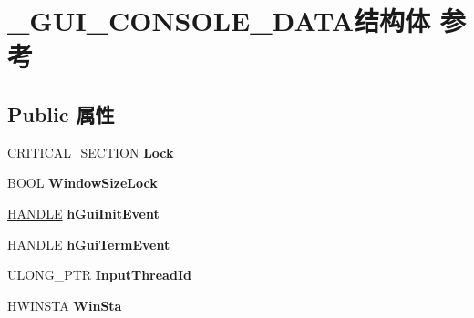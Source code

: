 \hypertarget{struct___g_u_i___c_o_n_s_o_l_e___d_a_t_a}{}\section{\+\_\+\+G\+U\+I\+\_\+\+C\+O\+N\+S\+O\+L\+E\+\_\+\+D\+A\+T\+A结构体 参考}
\label{struct___g_u_i___c_o_n_s_o_l_e___d_a_t_a}
\subsection*{Public 属性}
\begin{DoxyCompactItemize}
\item 
\mbox{\label{struct___g_u_i___c_o_n_s_o_l_e___d_a_t_a_a9a58505dcdd87ccac73b7a0d6cfcb242}} 
\hyperlink{struct___c_r_i_t_i_c_a_l___s_e_c_t_i_o_n}{C\+R\+I\+T\+I\+C\+A\+L\+\_\+\+S\+E\+C\+T\+I\+ON} {\bfseries Lock}
\item 
\mbox{\label{struct___g_u_i___c_o_n_s_o_l_e___d_a_t_a_a74f710b6ff7b2c7e42c0ee7fd5978f73}} 
B\+O\+OL {\bfseries Window\+Size\+Lock}
\item 
\mbox{\label{struct___g_u_i___c_o_n_s_o_l_e___d_a_t_a_a5d9a60a17c647747b83e9b9ce8cafab1}} 
\hyperlink{interfacevoid}{H\+A\+N\+D\+LE} {\bfseries h\+Gui\+Init\+Event}
\item 
\mbox{\label{struct___g_u_i___c_o_n_s_o_l_e___d_a_t_a_a709f942f35491ccb3acb75826c66cfe5}} 
\hyperlink{interfacevoid}{H\+A\+N\+D\+LE} {\bfseries h\+Gui\+Term\+Event}
\item 
\mbox{\label{struct___g_u_i___c_o_n_s_o_l_e___d_a_t_a_ab746542bf0e72fde8677542bbbb00fa7}} 
U\+L\+O\+N\+G\+\_\+\+P\+TR {\bfseries Input\+Thread\+Id}
\item 
\mbox{\label{struct___g_u_i___c_o_n_s_o_l_e___d_a_t_a_a35c49defb7107cc6dfaa70411d599a9c}} 
H\+W\+I\+N\+S\+TA {\bfseries Win\+Sta}
\item 
\mbox{\label{struct___g_u_i___c_o_n_s_o_l_e___d_a_t_a_a39c9fe8a47e1acb9aa45a72a563560c8}} 

\end{DoxyCompactItemize}
